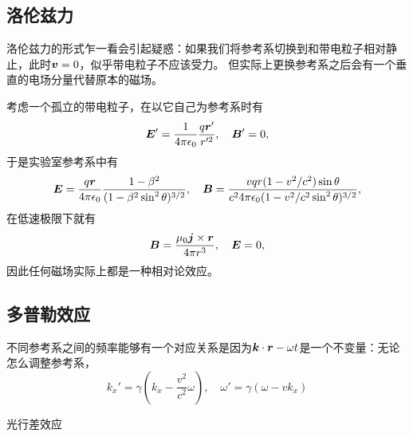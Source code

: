 \documentclass[UTF8, a4paper]{ctexart}
\begin{document}
\subsection{洛伦兹力}

洛伦兹力的形式乍一看会引起疑惑：如果我们将参考系切换到和带电粒子相对静止，此时$\vb*{v}=0$，似乎带电粒子不应该受力。
但实际上更换参考系之后会有一个垂直的电场分量代替原本的磁场。

考虑一个孤立的带电粒子，在以它自己为参考系时有
\[
    \vb*{E}' = \frac{1}{4\pi \epsilon_0} \frac{q \vb*{r}'}{r'^2}, \quad \vb*{B}'=0,
\]
于是实验室参考系中有
\begin{equation}
    \vb*{E} = \frac{q \vb*{r}}{4\pi \epsilon_0} \frac{1 - \beta^2}{(1 - \beta^2 \sin^2\theta)^{3/2}}, \quad \vb*{B} = \frac{vqr (1 - v^2/c^2) \sin \theta}{c^2 4\pi \epsilon_0 (1 - v^2/c^2 \sin^2\theta)^{3/2}},
\end{equation}
在低速极限下就有
\begin{equation}
    \vb*{B} = \frac{\mu_0 \vb*{j} \times \vb*{r}}{4\pi r^3}, \quad \vb*{E} = 0,
\end{equation}
因此任何磁场实际上都是一种相对论效应。

\subsection{多普勒效应}

不同参考系之间的频率能够有一个对应关系是因为$\vb*{k} \cdot \vb*{r} - \omega t$是一个不变量：无论怎么调整参考系，
\begin{equation}
    k_x' = \gamma (k_x - \frac{v^2}{c^2} \omega), \quad \omega' = \gamma (\omega - v k_x)
\end{equation}

光行差效应
\end{document}
